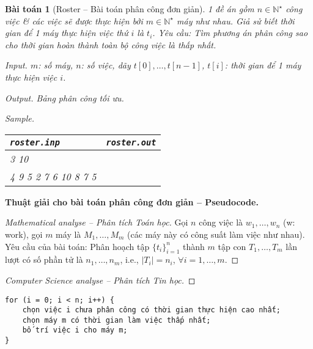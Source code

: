 \documentclass{article}
\newtheorem{baitoan}{Bài toán}
\begin{document}
\begin{baitoan}[Roster -- Bài toán phân công đơn giản]
	1 đề án gồm $n\in\mathbb{N}^\star$ công việc \& các việc sẽ được thực hiện bởi $m\in\mathbb{N}^\star$ máy như nhau. Giả sử biết thời gian để 1 máy thực hiện việc thứ $i$  là $t_i$. Yêu cầu: Tìm phương án phân công sao cho thời gian hoàn thành toàn bộ công việc là thấp nhất.
	\item {\sf Input.} $m$: số máy, $n$: số việc, dãy $t[0],\ldots,t[n-1]$, $t[i]$: thời gian để 1 máy thực hiện việc $i$.
	\item {\sf Output.} Bảng phân công tối ưu.
	\item {\sf Sample.}
	\begin{table}[H]
		\centering
		\begin{tabular}{|l|l|}
			\hline
			{\tt roster.inp} & {\tt roster.out} \\
			\hline
			3 10 &  \\
			4 9 5 2 7 6 10 8 7 5 &  \\
			\hline
		\end{tabular}
	\end{table}
\end{baitoan}
\noindent\textbf{\textsf{Thuật giải cho bài toán phân công đơn giản -- Pseudocode.}}
\begin{proof}[Mathematical analyse -- Phân tích Toán học]
	Gọi $n$ công việc là $w_1,\ldots,w_n$ (w: work), gọi $m$ máy là $M_1,\ldots,M_m$ (các máy này có công suất làm việc như nhau). Yêu cầu của bài toán: Phân hoạch tập $\{t_i\}_{i=1}^n$ thành $m$ tập con $T_1,\ldots,T_m$ lần lượt có số phần tử là $n_1,\ldots,n_m$, i.e., $|T_i| = n_i$, $\forall i = 1,\ldots,m$.
\end{proof}

\begin{proof}[Computer Science analyse -- Phân tích Tin học]
	
\end{proof}

\begin{verbatim}
for (i = 0; i < n; i++) {
    chọn việc i chưa phân công có thời gian thực hiện cao nhất;
    chọn máy m có thời gian làm việc thấp nhất;
    bố trí việc i cho máy m;
}
\end{verbatim}
\end{document}
